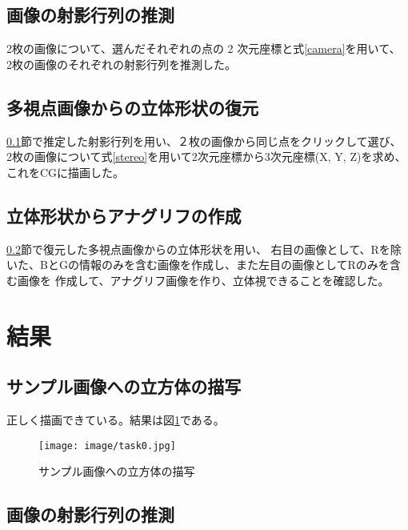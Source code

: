 \documentclass[11pt,a4j]{jsarticle}
\makeatletter
\newcommand{\figcaption}[1]{\def\@captype{figure}\caption{#1}}
\makeatother
\begin{document}
\subsection{画像の射影行列の推測}
\label{sub:画像の射影行列の推測}
2枚の画像について、選んだそれぞれの点の 2 次元座標と式\ref{camera}を用いて、
2枚の画像のそれぞれの射影行列を推測した。

\subsection{多視点画像からの立体形状の復元}
\label{sub:多視点画像からの立体形状の復元}
\ref{sub:画像の射影行列の推測}節で推定した射影行列を用い、２枚の画像から同じ点をクリックして選び、
2枚の画像について式\ref{stereo}を用いて2次元座標から3次元座標(X, Y, Z)を求め、これをCGに描画した。


\subsection{立体形状からアナグリフの作成}
\label{sub:立体形状からアナグリフの作成}

\ref{sub:多視点画像からの立体形状の復元}節で復元した多視点画像からの立体形状を用い、
右目の画像として、Rを除いた、BとGの情報のみを含む画像を作成し、また左目の画像としてRのみを含む画像を
作成して、アナグリフ画像を作り、立体視できることを確認した。

\section{結果}
\label{sec:結果}

\subsection{サンプル画像への立方体の描写}
\label{sub:result_box}

正しく描画できている。結果は図\ref{fig:サンプル画像への立方体の描写の写真}である。

\begin{figure}[H]
  \centering
  \texttt{[image: image/task0.jpg]}
  \figcaption{サンプル画像への立方体の描写}
  \label{fig:サンプル画像への立方体の描写の写真}
\end{figure}


\subsection{画像の射影行列の推測}
\label{sub:result_syaei}
\end{document}
